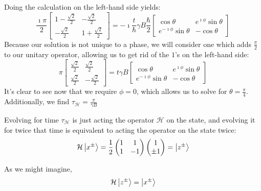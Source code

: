 \documentclass[a4paper,twoside]{article}
\begin{document}
\begin{itemize}
\begin{tcolorbox}[breakable]
    Doing the calculation on the left-hand side yields:
    \begin{equation}
        \frac{\imath\pi}{2}\begin{bmatrix} 1-\frac{\sqrt{2}}{2} & -\frac{\sqrt{2}}{2} \\ -\frac{\sqrt{2}}{2} & 1 + \frac{\sqrt{2}}{2}      \end{bmatrix} = -\imath \frac{t}{\hbar}\gamma B \frac{\hbar}{2}\begin{bmatrix} \cos\theta & e^{\imath\phi}\sin\theta \\ e^{-\imath\phi}\sin\theta & -\cos\theta  \end{bmatrix} 
    \end{equation}
    Because our solution is not unique to a phase, we will consider one which adds $\frac{\pi}{2}$ to our unitary operator, allowing us to get rid of the $1$'s on the left-hand side:
    \begin{equation}
        \pi\begin{bmatrix} \frac{\sqrt{2}}{2} & \frac{\sqrt{2}}{2} \\ \frac{\sqrt{2}}{2} & -\frac{\sqrt{2}}{2} \end{bmatrix} = t\gamma B \begin{bmatrix} \cos\theta & e^{\imath\phi}\sin\theta \\ e^{-\imath\phi}\sin\theta & -\cos\theta  \end{bmatrix}
    \end{equation}
It's clear to see now that we require $\phi = 0$, which allows us to solve for $\theta = \frac{\pi}{4}$. Additionally, we find $\tau_\mathcal{H} =\frac{\pi}{\gamma B}$

Evolving for time $\tau_\mathcal{H}$ is just acting the operator $\mathcal{H}$ on the state, and evolving it for twice that time is equivalent to acting the operator on the state twice:
\begin{equation}
    \mathcal{H}\ket{x^\pm} = \frac{1}{2}\begin{pmatrix} 1&1\\1&-1 \end{pmatrix} \begin{pmatrix} 1\\ \pm 1 \end{pmatrix} = \ket{z^\pm}
\end{equation}

As we might imagine,
\begin{equation}
    \mathcal{H}\ket{z^\pm} = \ket{x^\pm}
\end{equation}


\end{tcolorbox}
\end{itemize}
\end{document}
